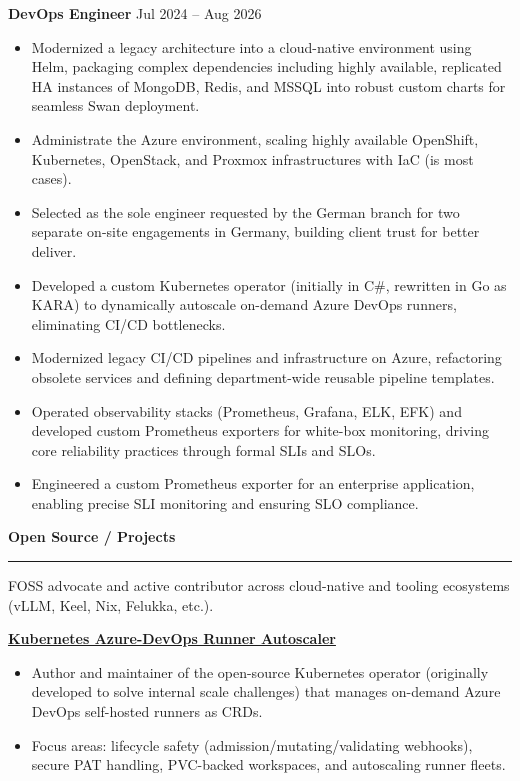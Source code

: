 \documentclass[a4paper,9pt]{extarticle}
\newcommand{\cvsection}[1]{%
  \vspace{5pt}%
  {\normalsize\bfseries\textcolor{accent}{#1}}\\[-5pt]%
  \textcolor{accent}{\rule{\linewidth}{0.5pt}}%
  \vspace{4pt}%
}
\begin{document}
{\textbf{DevOps Engineer}} \hfill {\footnotesize\textcolor{muted}{Jul 2024 -- Aug 2026}}\par\vspace{-2pt}
\begin{itemize}[before=\linespread{1.2}\selectfont]
	\item Modernized a legacy architecture into a cloud-native environment using Helm, packaging complex dependencies including highly available, replicated HA instances of MongoDB, Redis, and MSSQL into robust custom charts for seamless Swan deployment.
	\item Administrate the Azure environment, scaling highly available OpenShift, Kubernetes, OpenStack, and Proxmox infrastructures with IaC (is most cases).
	\item Selected as the sole engineer requested by the German branch for two separate on-site engagements in Germany, building client trust for better deliver.
	\item Developed a custom Kubernetes operator (initially in C\#, rewritten in Go as KARA) to dynamically autoscale on-demand Azure DevOps runners, eliminating CI/CD bottlenecks.
	\item Modernized legacy CI/CD pipelines and infrastructure on Azure, refactoring obsolete services and defining department-wide reusable pipeline templates.
	\item Operated observability stacks (Prometheus, Grafana, ELK, EFK) and developed custom Prometheus exporters for white-box monitoring, driving core reliability practices through formal SLIs and SLOs.
	\item Engineered a custom Prometheus exporter for an enterprise application, enabling precise SLI monitoring and ensuring SLO compliance.
\end{itemize}
\vspace{4pt}

\cvsection{Open Source / Projects}

{\footnotesize FOSS advocate and active contributor across cloud-native and tooling ecosystems (vLLM, Keel, Nix, Felukka, etc.).}

\vspace{3pt}
\textbf{\href{https://github.com/felukka/kara}{Kubernetes Azure-DevOps Runner Autoscaler}}\\
\begin{itemize}
	\item Author and maintainer of the open-source Kubernetes operator (originally developed to solve internal scale challenges) that manages on-demand Azure DevOps self-hosted runners as CRDs.
	\item Focus areas: lifecycle safety (admission/mutating/validating webhooks), secure PAT handling, PVC-backed workspaces, and autoscaling runner fleets.
\end{itemize}
\end{document}

